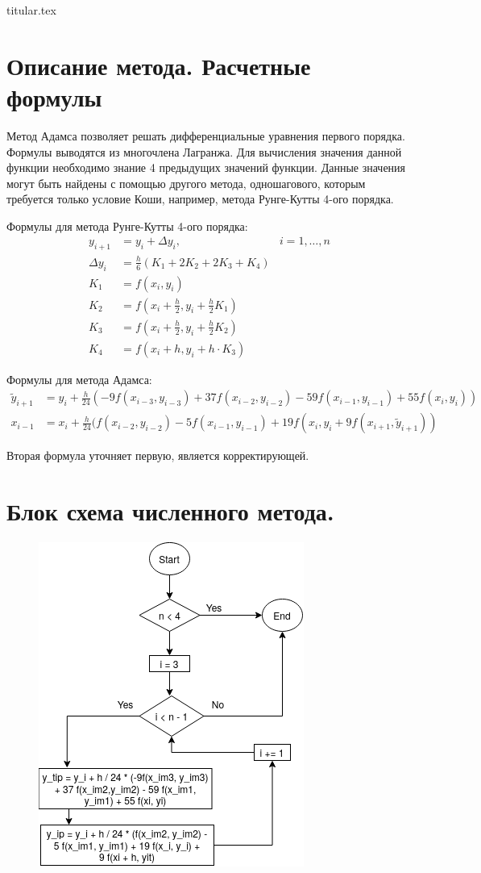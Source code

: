 \documentclass[11pt, a4paper]{article}
\begin{document}
{titular.tex}
\newpage

\section{Описание метода. Расчетные формулы}

Метод Адамса позволяет решать дифференциальные уравнения первого порядка. Формулы выводятся из
многочлена Лагранжа. Для вычисления значения данной функции необходимо знание 4 предыдущих значений
функции. Данные значения могут быть найдены с помощью другого метода, одношагового, которым
требуется только условие Коши, например, метода Рунге-Кутты 4-ого порядка.

\medskip\noindent
Формулы для метода Рунге-Кутты 4-ого порядка:
\begin{align*}
  y_{i + 1} &= y_i + \Delta y_i, & i = 1, \dots, n \\
  \Delta y_i &= \frac{h}{6} (K_1 + 2 K_2 + 2 K_3 + K_4) \\
  K_1 &= f(x_i, y_i) \\
  K_2 &= f(x_i + \frac{h}{2}, y_i + \frac{h}{2}K_1) \\
  K_3 &= f(x_i + \frac{h}{2}, y_i + \frac{h}{2}K_2) \\
  K_4 &= f(x_i + h, y_i + h \cdot K_3)
\end{align*}

\medskip \noindent
Формулы для метода Адамса:
\begin{align*}
  \widetilde{y}_{i + 1} &= y_i + \frac{h}{24}(-9 f(x_{i - 3}, y_{i - 3}) + 37 f(x_{i - 2}, y_{i -
  2}) - 59 f(x_{i - 1}, y_{i - 1}) + 55 f(x_{i}, y_i)) \\
  x_{i - 1} &= x_i + \frac{h}{24} (f(x_{i - 2}, y_{i - 2}) - 5 f(x_{i - 1}, y_{i - 1}) + 19 f(x_{i},
  y_{i} + 9 f(x_{i + 1}, \widetilde{y}_{i + 1}))
\end{align*}

\noindent
Вторая формула уточняет первую, является корректирующей.

\section{Блок схема численного метода.}


\begin{figure}[h]
  \centering
  \includegraphics[width=0.5\linewidth]{block.png}
  \label{fig:result-png}
\end{figure}
\end{document}
